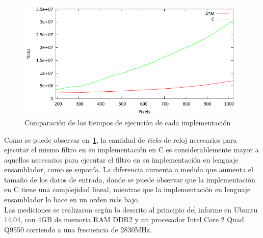 \documentclass[a4paper]{article}
\begin{document}
\begin{figure}[H]
  \begin{center}
	\includegraphics[scale=0.77]{imagenes/pixelarC.png}
	\caption{Comparación de los tiempos de ejecución de cada implementación}
	\label{pixelar_asmvsc}
  \end{center}
\end{figure}

Como se puede observar en~\ref{pixelar_asmvsc}, la cantidad de \textit{ticks} de reloj necesarios para ejecutar el mismo filtro en su implementación en C es considerablemente mayor a aquellos necesarios para ejecutar el filtro en su implementación en lenguaje ensamblador, como se suponía. La diferencia aumenta a medida que aumenta el tamaño de los datos de entrada, donde se puede observar que la implementación en C tiene una complejidad lineal, mientras que la implementación en lenguaje ensamblador lo hace en un orden más bajo.
\\
Las mediciones se realizaron según lo descrito al principio del informe en Ubuntu 14.04, con 4GB de memoria RAM DDR2 y un procesador Intel Core 2 Quad Q9550 corriendo a una frecuencia de 2830MHz.
\end{document}
